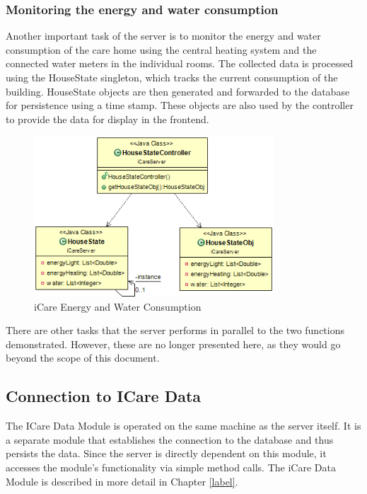 \subsubsection{Monitoring the energy and water consumption}
Another important task of the server is to monitor the energy and water consumption of the care home using the central heating system and the connected water meters in the individual rooms. The collected data is processed using the HouseState singleton, which tracks the current consumption of the building. HouseState objects are then generated and forwarded to the database for persistence using a time stamp. These objects are also used by the controller to provide the data for display in the frontend.
\begin{figure}[H]
	\centering
	\includegraphics[width =0.8\textwidth]{images/houseState.png}
	\caption{iCare Energy and Water Consumption}
	\label{icare-houseState}
\end{figure}
There are other tasks that the server performs in parallel to the two functions demonstrated. However, these are no longer presented here, as they would go beyond the scope of this document.
\subsection{Connection to ICare Data}
The ICare Data Module is operated on the same machine as the server itself. It is a separate module that establishes the connection to the database and thus persists the data. Since the server is directly dependent on this module, it accesses the module's functionality via simple method calls. The iCare Data Module is described in more detail in Chapter \ref{label}.